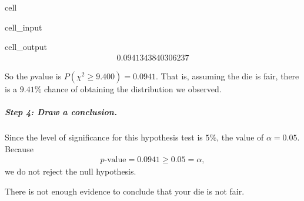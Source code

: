 \documentclass[letterpaper,10pt,english]{jupyterBook}
\begin{document}
\begin{sphinxuseclass}{cell}\begin{sphinxVerbatimInput}

\begin{sphinxuseclass}{cell_input}
\begin{sphinxVerbatim}[commandchars=\\\{\}]
\end{sphinxVerbatim}

\end{sphinxuseclass}\end{sphinxVerbatimInput}
\begin{sphinxVerbatimOutput}

\begin{sphinxuseclass}{cell_output}\begin{equation*}
\begin{split}0.0941343840306237\end{split}
\end{equation*}
\end{sphinxuseclass}\end{sphinxVerbatimOutput}

\end{sphinxuseclass}
\sphinxAtStartPar
So the \(p\)\sphinxhyphen{}value is \(P(\chi^2 \geq 9.400) = 0.0941\). That is, assuming the die is fair, there is a \(9.41\%\) chance of obtaining the distribution we observed.


\subparagraph{Step 4: Draw a conclusion.}
\label{\detokenize{Ch7 The Chi-Square Distribution/7.3 Goodness-of-Fit Test:step-4-draw-a-conclusion}}
\sphinxAtStartPar
Since the level of significance for this hypothesis test is \(5\%\), the value of \(\alpha = 0.05\). Because
\begin{equation*}
\begin{split} p\text{-value} = 0.0941 \geq 0.05 = \alpha, \end{split}
\end{equation*}
\sphinxAtStartPar
we do not reject the null hypothesis.

\sphinxAtStartPar
There is not enough evidence to conclude that your die is not fair.

\sphinxstepscope
\end{document}

